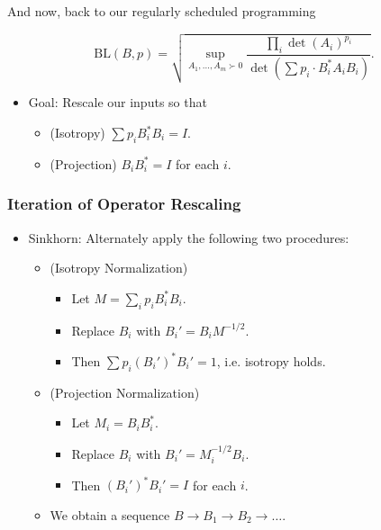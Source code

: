 \documentclass[usenames,dvipsnames,12pt]{beamer}
\begin{document}
\begin{frame}

And now, back to our regularly scheduled programming

\[ \text{BL}(B,p) = \sqrt{ \sup_{A_1,\dots,A_m \succ 0} \frac{\prod_i \det(A_i)^{p_i}}{\det(\sum p_i \cdot B_i^* A_i B_i)}}. \]

\begin{itemize}
    \pause
    \item Goal: Rescale our inputs so that
    \begin{itemize}
        \pause
        \item (Isotropy) $\sum p_i B_i^* B_i = I$.
        
        \pause
        \item (Projection) $B_i B_i^* = I$ for each $i$.
    \end{itemize}

\end{itemize}

\end{frame}


\begin{frame}
    \frametitle{Iteration of Operator Rescaling}

    \begin{itemize}
    \item Sinkhorn: Alternately apply the following two procedures:
    \begin{itemize}
        \pause
        \item (Isotropy Normalization)
        \begin{itemize}
            \pause
            \item Let $M = \sum_i p_i B_i^* B_i$.
            \pause
            \item Replace $B_i$ with $B_i' = B_i M^{-1/2}$.
            \pause
            \item Then $\sum p_i (B_i')^* B_i' = 1$, i.e. isotropy holds.
        \end{itemize}

        \pause
        \item (Projection Normalization)
        \begin{itemize}
            \pause
            \item Let $M_i = B_i B_i^*$.
            
            \pause
            \item Replace $B_i$ with $B_i' = M_i^{-1/2} B_i$.
            
            \pause
            \item Then $(B_i')^* B_i' = I$ for each $i$.
        \end{itemize}

        \pause
        \item We obtain a sequence $B \to B_1 \to B_2 \to \dots$.
    \end{itemize}
\end{itemize}

\end{frame}
\end{document}
